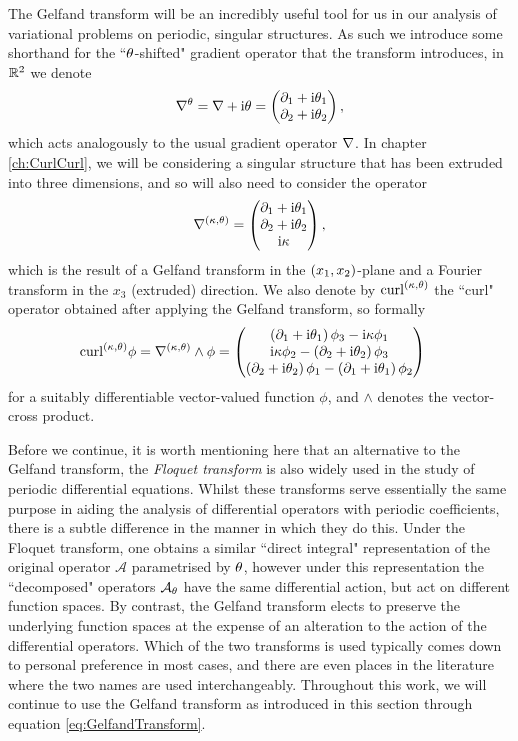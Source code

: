 The Gelfand transform will be an incredibly useful tool for us in our analysis of variational problems on periodic, singular structures.
As such we introduce some shorthand for the ``$\theta$-shifted" gradient operator that the transform introduces, in $\mathbb{R}^2$ we denote
\begin{align*}
	\nabla^{\theta} = \nabla + \mathrm{i}\theta 
	= \begin{pmatrix} \partial_1 + \mathrm{i}\theta_1 \\ \partial_2 + \mathrm{i}\theta_2 \end{pmatrix},
\end{align*}
which acts analogously to the usual gradient operator $\nabla$.
In chapter \ref{ch:CurlCurl}, we will be considering a singular structure that has been extruded into three dimensions, and so will also need to consider the operator
\begin{align*}
	\nabla^{\left( \kappa, \theta \right)} = 
	\begin{pmatrix} \partial_1 + \mathrm{i}\theta_1 \\ \partial_2 + \mathrm{i}\theta_2 \\ \mathrm{i}\kappa \end{pmatrix},
\end{align*}
which is the result of a Gelfand transform in the $\left( x_1,x_2 \right)$-plane and a Fourier transform in the $x_3$ (extruded) direction.
We also denote by $\mathrm{curl}_{}^{\left( \kappa, \theta \right)}$ the ``curl" operator obtained after applying the Gelfand transform, so formally
\begin{align*}
	\mathrm{curl}_{}^{\left( \kappa, \theta \right)}\phi &= \nabla^{\left( \kappa, \theta \right)}\wedge\phi
	= 
	\begin{pmatrix}
		\left( \partial_1+\mathrm{i}\theta_1 \right)\phi_3 - \mathrm{i}\kappa\phi_1 \\
		\mathrm{i}\kappa\phi_2 - \left( \partial_2+\mathrm{i}\theta_2 \right)\phi_3 \\
		\left( \partial_2+\mathrm{i}\theta_2 \right)\phi_1 - \left( \partial_1+\mathrm{i}\theta_1 \right)\phi_2
	\end{pmatrix}
\end{align*}
for a suitably differentiable vector-valued function $\phi$, and $\wedge$ denotes the vector-cross product.

Before we continue, it is worth mentioning here that an alternative to the Gelfand transform, the \emph{Floquet transform} is also widely used in the study of periodic differential equations.
Whilst these transforms serve essentially the same purpose in aiding the analysis of differential operators with periodic coefficients, there is a subtle difference in the manner in which they do this.
Under the Floquet transform, one obtains a similar ``direct integral" representation of the original operator $\mathcal{A}$ parametrised by $\theta$, however under this representation the ``decomposed" operators $\mathcal{A}_{\theta}$ have the same differential action, but act on different function spaces.
By contrast, the Gelfand transform elects to preserve the underlying function spaces at the expense of an alteration to the action of the differential operators.
Which of the two transforms is used typically comes down to personal preference in most cases, and there are even places in the literature where the two names are used interchangeably.
Throughout this work, we will continue to use the Gelfand transform as introduced in this section through equation \eqref{eq:GelfandTransform}.